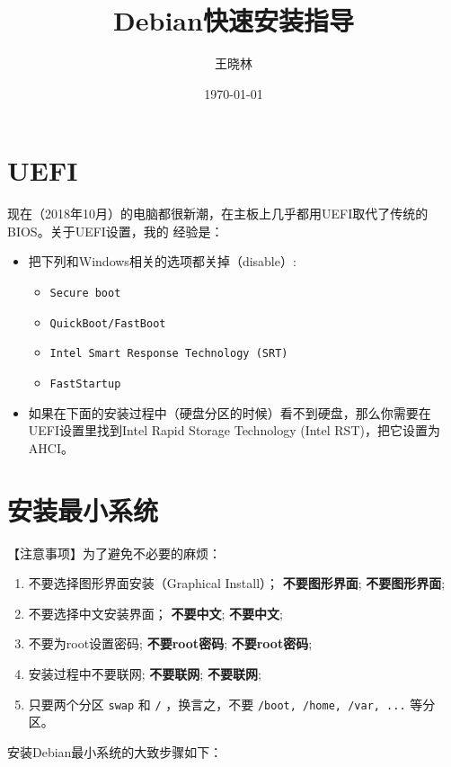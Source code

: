 \documentclass{wx672ctexart} \usepackage{hyperref}
\author{王晓林}
\date{\today}
\title{Debian快速安装指导}
\begin{document}
\maketitle
\tableofcontents


\section{UEFI}
\label{sec:org2d26eb1}
现在（2018年10月）的电脑都很新潮，在主板上几乎都用UEFI取代了传统的BIOS。关于UEFI设置，我的
经验是：

\begin{itemize}
\item 把下列和Windows相关的选项都关掉（disable）:
\begin{itemize}
\item \texttt{Secure boot}
\item \texttt{QuickBoot/FastBoot}
\item \texttt{Intel Smart Response Technology (SRT)}
\item \texttt{FastStartup}
\end{itemize}

\item 如果在下面的安装过程中（硬盘分区的时候）看不到硬盘，那么你需要在UEFI设置里找到Intel Rapid Storage
Technology (Intel RST)，把它设置为AHCI。
\end{itemize}

\section{安装最小系统}
\label{sec:org94724dc}

【注意事项】为了避免不必要的麻烦：

\begin{enumerate}
\item 不要选择图形界面安装（Graphical Install）； \textbf{不要图形界面}; \textbf{不要图形界面};
\item 不要选择中文安装界面； \textbf{不要中文}; \textbf{不要中文};
\item 不要为root设置密码; \textbf{不要root密码}; \textbf{不要root密码};
\item 安装过程中不要联网; \textbf{不要联网}; \textbf{不要联网};
\item 只要两个分区 \texttt{swap} 和 \texttt{/} ，换言之，不要 \texttt{/boot, /home, /var, ...} 等分区。
\end{enumerate}

安装Debian最小系统的大致步骤如下：
\end{document}
